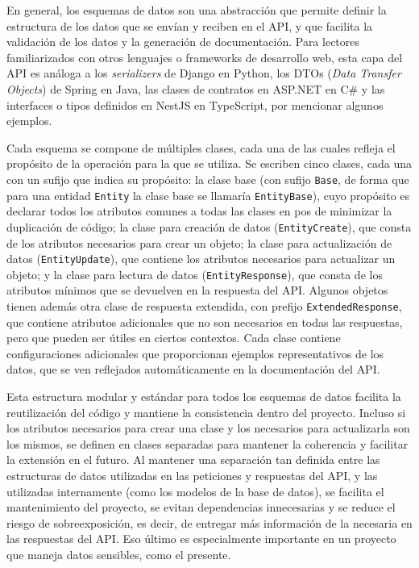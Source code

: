 En general, los esquemas de datos son una abstracción que permite definir la estructura de los datos que se envían y reciben en el \gls{API}, y que facilita la validación de los datos y la generación de documentación. Para lectores familiarizados con otros lenguajes o frameworks de desarrollo web, esta capa del \gls{API} es análoga a los \textit{serializers} de Django en \gls{Python}, los DTOs (\textit{Data Transfer Objects}) de Spring en Java, las clases de contratos en ASP.NET en C\# y las interfaces o tipos definidos en NestJS en TypeScript, por mencionar algunos ejemplos.

Cada esquema se compone de múltiples clases, cada una de las cuales refleja el propósito de la operación para la que se utiliza. Se escriben cinco clases, cada una con un sufijo que indica su propósito: la clase base (con sufijo \lstinline|Base|, de forma que para una entidad \lstinline|Entity| la clase base se llamaría \lstinline|EntityBase|), cuyo propósito es declarar todos los atributos comunes a todas las clases en pos de minimizar la duplicación de código; la clase para creación de datos (\lstinline|EntityCreate|), que consta de los atributos necesarios para crear un objeto; la clase para actualización de datos (\lstinline|EntityUpdate|), que contiene los atributos necesarios para actualizar un objeto; y la clase para lectura de datos (\lstinline|EntityResponse|), que consta de los atributos mínimos que se devuelven en la respuesta del \gls{API}. Algunos objetos tienen además otra clase de respuesta extendida, con prefijo \lstinline|ExtendedResponse|, que contiene atributos adicionales que no son necesarios en todas las respuestas, pero que pueden ser útiles en ciertos contextos. Cada clase contiene configuraciones adicionales que proporcionan ejemplos representativos de los datos, que se ven reflejados automáticamente en la documentación del \gls{API}.

Esta estructura modular y estándar para todos los esquemas de datos facilita la reutilización del código y mantiene la consistencia dentro del proyecto. Incluso si los atributos necesarios para crear una clase y los necesarios para actualizarla son los mismos, se definen en clases separadas para mantener la coherencia y facilitar la extensión en el futuro. Al mantener una separación tan definida entre las estructuras de datos utilizadas en las peticiones y respuestas del \gls{API}, y las utilizadas internamente (como los modelos de la base de datos), se facilita el mantenimiento del proyecto, se evitan dependencias innecesarias y se reduce el riesgo de \gls{sobreexposición}, es decir, de entregar más información de la necesaria en las respuestas del \gls{API}. Eso último es especialmente importante en un proyecto que maneja datos sensibles, como el presente.

